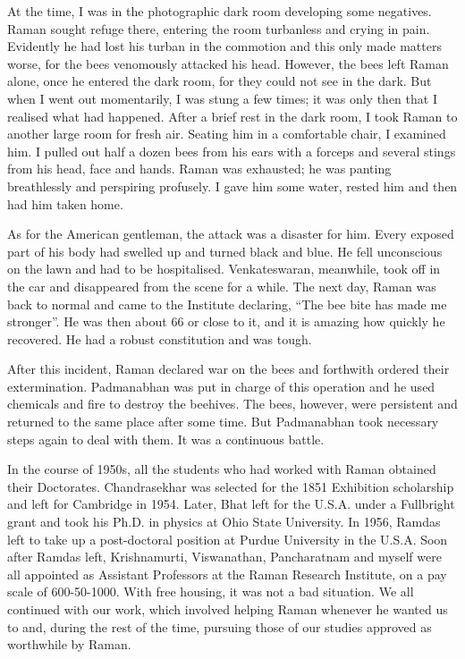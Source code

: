 At the time, I was in the photographic dark room developing
some negatives. Raman sought refuge there, entering the room
turbanless and crying in pain. Evidently he had lost his turban
in the commotion and this only made matters worse, for the bees
venomously attacked his head. However, the bees left Raman
alone, once he entered the dark room, for they could not see in
the dark. But when I went out momentarily, I was stung a few
times; it was only then that I realised what had happened. After
a brief rest in the dark room, I took Raman to another large room
for fresh air. Seating him in a comfortable chair, I examined him.
I pulled out half a dozen bees from his ears with a forceps and
several stings from his head, face and hands. Raman was
exhausted; he was panting breathlessly and perspiring profusely.
I gave him some water, rested him and then had him taken home.

As for the American gentleman, the attack was a disaster
for him. Every exposed part of his body had swelled up and turned
black and blue. He fell unconscious on the lawn and had to be
hospitalised. Venkateswaran, meanwhile, took off in the car and
disappeared from the scene for a while. The next day, Raman
was back to normal and came to the Institute declaring, ``The bee
bite has made me stronger''. He was then about 66 or close to
it, and it is amazing how quickly he recovered. He had a robust
constitution and was tough.

After this incident, Raman declared war on the bees and
forthwith ordered their extermination. Padmanabhan was put
in charge of this operation and he used chemicals and fire to
destroy the beehives. The bees, however, were persistent and
returned to the same place after some time. But Padmanabhan
took necessary steps again to deal with them. It was a continuous
battle.

\medskip
{}
\smallskip


\noindent
In the course of 1950s, all the students who had worked with
Raman obtained their Doctorates. Chandrasekhar was selected
for the 1851 Exhibition scholarship and left for Cambridge in
1954. Later, Bhat left for the U.S.A. under a Fullbright grant
and took his Ph.D. in physics at Ohio State University. In 1956,
Ramdas left to take up a post-doctoral position at Purdue
University in the U.S.A. Soon after Ramdas left, Krishnamurti,
Viswanathan, Pancharatnam and myself were all appointed as
Assistant Professors at the Raman Research Institute, on a pay
scale of 600-50-1000. With free housing, it was not a bad situation.
We all continued with our work, which involved helping Raman
whenever he wanted us to and, during the rest of the time,
pursuing those of our studies approved as worthwhile by Raman.

